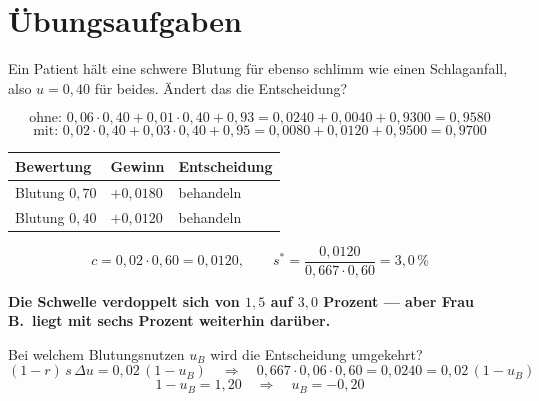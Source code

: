 \section{Übungsaufgaben}

\begin{aufgabe}
Ein Patient hält eine schwere Blutung für ebenso schlimm wie einen Schlaganfall, also $u = 0{,}40$ für beides. Ändert das die Entscheidung?

\loesung
{}
\[ \text{ohne: } 0{,}06\cdot0{,}40 + 0{,}01\cdot0{,}40 + 0{,}93 = 0{,}0240+0{,}0040+0{,}9300 = 0{,}9580 \]
\[ \text{mit: } 0{,}02\cdot0{,}40 + 0{,}03\cdot0{,}40 + 0{,}95 = 0{,}0080+0{,}0120+0{,}9500 = 0{,}9700 \]

\begin{center}
{\small
\renewcommand{\arraystretch}{1.48}
\begin{tabular}{@{}P{2.6cm}P{2.2cm}P{2.2cm}@{}}
\toprule
\textbf{Bewertung} & \textbf{Gewinn} & \textbf{Entscheidung}\\
\midrule
Blutung $0{,}70$ & $+0{,}0180$ & behandeln\\
Blutung $0{,}40$ & $+0{,}0120$ & behandeln\\
\bottomrule
\end{tabular}}
\end{center}

\[ c = 0{,}02\cdot0{,}60 = 0{,}0120, \qquad s^{*} = \frac{0{,}0120}{0{,}667\cdot0{,}60} = 3{,}0\,\% \]

\begin{center}
\begin{minipage}{0.9\textwidth}
\textbf{Die Schwelle verdoppelt sich von $1{,}5$ auf $3{,}0$ Prozent --- aber Frau B.\ liegt mit sechs Prozent weiterhin darüber.}
\end{minipage}
\end{center}

Bei welchem Blutungsnutzen $u_B$ wird die Entscheidung umgekehrt?
\[ (1-r)\,s\,\Delta u = 0{,}02\,(1-u_B) \quad\Longrightarrow\quad 0{,}667\cdot0{,}06\cdot0{,}60 = 0{,}0240 = 0{,}02\,(1-u_B) \]
\[ 1-u_B = 1{,}20 \quad\Longrightarrow\quad u_B = -0{,}20 \]

\begin{center}
\begin{minipage}{0.88\textwidth}
\end{minipage}
\end{center}
\end{aufgabe}

